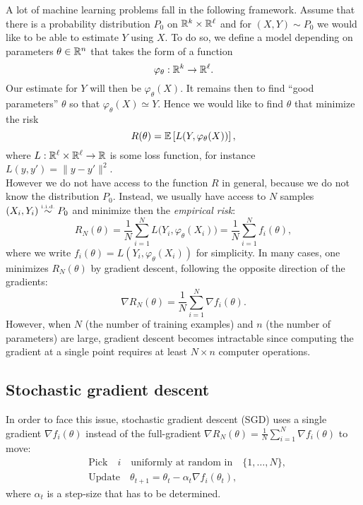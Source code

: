 \documentclass[11pt,nocut]{article}
\begin{document}
A lot of machine learning problems fall in the following framework.
Assume that there is a probability distribution $P_0$ on $\mathbb{R}^k \times \mathbb{R}^{\ell}$ and for $(X,Y) \sim P_0$ we would like to be able to estimate $Y$ using $X$. To do so, we define a model depending on parameters $\theta \in \mathbb{R}^n$ that takes the form of a function
$$
	\varphi_{\theta}:  \mathbb{R}^k  \to  \mathbb{R}^{\ell}.
$$
Our estimate for $Y$ will then be $\varphi_{\theta}(X)$. It remains then to find ``good parameters'' $\theta$ so that $\varphi_{\theta}(X) \simeq Y$. Hence we would like to find $\theta$ that minimize the risk
\begin{equation}
R(\theta) = \mathbb{E} \left[L(Y,\varphi_{\theta}(X))\right],
\end{equation}
where $L:\mathbb{R}^{\ell} \times \mathbb{R}^{\ell} \to \mathbb{R}$ is some loss function, for instance $L(y,y') = \|y-y'\|^2$.
\\

However we do not have access to the function $R$ in general, because we do not know the distribution $P_0$. Instead, we usually have access to $N$ samples $(X_i,Y_i) \overset{\text{\tiny i.i.d.}}{\sim} P_0$ and minimize then the \emph{empirical risk}:
$$
R_N(\theta) = \frac{1}{N} \sum_{i=1}^N L\big(Y_i, \varphi_{\theta}(X_i)\big) = \frac{1}{N} \sum_{i=1}^N f_i(\theta),
$$
where we write $f_i(\theta) = L(Y_i,\varphi_{\theta}(X_i))$ for simplicity. In many cases, one minimizes $R_N(\theta)$ by gradient descent, following the opposite direction of the gradients:
$$
\nabla R_N (\theta) = \frac{1}{N} \sum_{i=1}^N \nabla f_i(\theta).
$$
However, when $N$ (the number of training examples) and $n$ (the number of parameters) are large, gradient descent becomes intractable since computing the gradient at a single point requires at least $N \times n$ computer operations.

\subsection{Stochastic gradient descent}

In order to face this issue, stochastic gradient descent (SGD) uses a single gradient $\nabla f_i(\theta)$ instead of the full-gradient $\nabla R_N(\theta) = \frac{1}{N} \sum_{i=1}^N \nabla f_i(\theta)$ to move:
\begin{align*}
	&\text{Pick} \quad i \quad \text{uniformly at random in} \quad \{1, \dots, N\}, \\
	&\text{Update} \quad \theta_{t+1} = \theta_t - \alpha_t \nabla f_i(\theta_t),
\end{align*}
where $\alpha_t$ is a step-size that has to be determined.
\\
\end{document}
